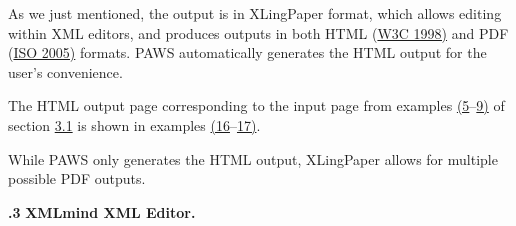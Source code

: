 \documentclass[12pt]{article}
\begin{document}
As we just mentioned, the output is in {XLingPaper} format, which allows editing within XML editors, and produces outputs in both HTML (\hyperlink{rW3CHTML}{W3C  1998)} and PDF (\hyperlink{rISOPDF1.4}{ISO  2005)} formats. {PAWS} automatically generates the HTML output for the user's convenience.\par{}\indent The HTML output page corresponding to the input page from examples \hyperlink{xPossesors1}{(5}–\hyperlink{xPossessors3}{9)} of section \hyperlink{sPages}{3.1} is shown in examples \hyperlink{xPossessorsHtml1}{(16}–\hyperlink{xPossessorsHtml2}{17)}.\par{}{\vspace{12pt}\raggedright{}
}{\vspace{12pt}\raggedright{}
\vspace{12pt}}\par\indent While {PAWS} only generates the HTML output, {XLingPaper} allows for multiple possible PDF outputs.\par{}\vspace{.25in}\noindent\protect\hypertarget{sXMLMind}{{\noindent
\textbf{{.3 }}}}{\noindent
\textbf{{\protect\noindent
{XMLmind XML Editor}. }}}
\end{document}
